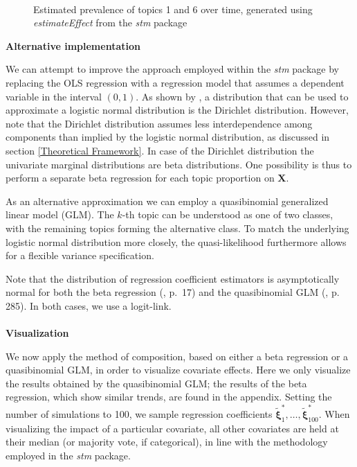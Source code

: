 \begin{figure}[h!]
\begin{subfigure}[b]{0.4\linewidth}
  \end{subfigure}\\
  \caption{Estimated prevalence of topics 1 and 6 over time, generated using \textit{estimateEffect} from the \textit{stm} package}
  \label{fig:estEffect_topic16}
\end{figure}
\noindent \textbf{Alternative implementation} \vspace{10px}

\noindent We can attempt to improve the approach employed within the \textit{stm} package by replacing the OLS regression with a regression model that assumes a dependent variable in the interval $(0,1)$. As shown by \cite{atchison1980logistic}, a distribution that can be used to approximate a logistic normal distribution is the Dirichlet distribution. However, note that the Dirichlet distribution assumes less interdependence among components than implied by the logistic normal distribution, as discussed in section \ref{Theoretical Framework}. In case of the Dirichlet distribution the univariate marginal distributions are beta distributions. One possibility is thus to perform a separate beta regression for each topic proportion on $\boldsymbol{X}$. 

As an alternative approximation we can employ a quasibinomial generalized linear model (GLM). The $k$-th topic can be understood as one of two classes, with the remaining topics forming the alternative class. To match the underlying logistic normal distribution more closely, the quasi-likelihood furthermore allows for a flexible variance specification. 

Note that the distribution of regression coefficient estimators is asymptotically normal for both the beta regression (\citealp{ferrari2004beta}, p.\ 17) and the quasibinomial GLM (\citealp{fahrmeir2007regression}, p. 285). In both cases, we use a logit-link. \\
\\
\noindent \textbf{Visualization} \vspace{10px}

\noindent We now apply the method of composition, based on either a beta regression or a quasibinomial GLM, in order to visualize covariate effects. Here we only visualize the results obtained by the quasibinomial GLM; the results of the beta regression, which show similar trends, are found in the appendix. Setting the number of simulations to 100, we sample regression coefficients $\tilde{\boldsymbol{\xi}}^*_1, \dots, \tilde{\boldsymbol{\xi}}^*_{100}$. When visualizing the impact of a particular covariate, all other covariates are held at their median (or majority vote, if categorical), in line with the methodology employed in the \textit{stm} package.

